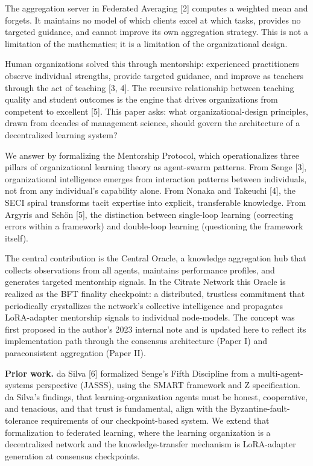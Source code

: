The aggregation server in Federated Averaging {[}2{]} computes a
weighted mean and forgets. It maintains no model of which clients excel
at which tasks, provides no targeted guidance, and cannot improve its
own aggregation strategy. This is not a limitation of the mathematics;
it is a limitation of the organizational design.

Human organizations solved this through mentorship: experienced
practitioners observe individual strengths, provide targeted guidance,
and improve as teachers through the act of teaching {[}3, 4{]}. The
recursive relationship between teaching quality and student outcomes is
the engine that drives organizations from competent to excellent
{[}5{]}. This paper asks: what organizational-design principles, drawn
from decades of management science, should govern the architecture of a
decentralized learning system?

We answer by formalizing the Mentorship Protocol, which operationalizes
three pillars of organizational learning theory as agent-swarm patterns.
From Senge {[}3{]}, organizational intelligence emerges from interaction
patterns between individuals, not from any individual's capability
alone. From Nonaka and Takeuchi {[}4{]}, the SECI spiral transforms
tacit expertise into explicit, transferable knowledge. From Argyris and
Schön {[}5{]}, the distinction between single-loop learning (correcting
errors within a framework) and double-loop learning (questioning the
framework itself).

The central contribution is the Central Oracle, a knowledge aggregation
hub that collects observations from all agents, maintains performance
profiles, and generates targeted mentorship signals. In the Citrate
Network this Oracle is realized as the BFT finality checkpoint: a
distributed, trustless commitment that periodically crystallizes the
network's collective intelligence and propagates LoRA-adapter mentorship
signals to individual node-models. The concept was first proposed in the
author's 2023 internal note and is updated here to reflect its
implementation path through the consensus architecture (Paper I) and
paraconsistent aggregation (Paper II).

\textbf{Prior work.} da Silva {[}6{]} formalized Senge's Fifth
Discipline from a multi-agent-systems perspective (JASSS), using the
SMART framework and Z specification. da Silva's findings, that
learning-organization agents must be honest, cooperative, and tenacious,
and that trust is fundamental, align with the Byzantine-fault-tolerance
requirements of our checkpoint-based system. We extend that
formalization to federated learning, where the learning organization is
a decentralized network and the knowledge-transfer mechanism is
LoRA-adapter generation at consensus checkpoints.

